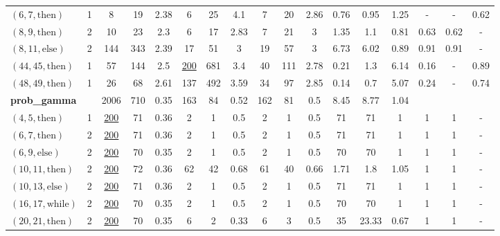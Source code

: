 \documentclass[sigconf]{acmart}
\newcommand{\thenBr}{\text{then}}
\newcommand{\elseBr}{\text{else}}
\newcommand{\inWhile}{\text{while}}
\newcommand{\un}[1]{\underline{#1}}
\begin{document}
\begin{table}[!t]
\begin{tabular}{lc|ccc|ccc|ccc|ccc|ccc}
    $(6,7,\thenBr)$   & 1        & 8        & 19   & 2.38      & 6    & 25   & 4.1          & 7   & 20  & 2.86             & 0.76   & 0.95  & 1.25   & - & -  &  0.62 \\
    $(8,9,\thenBr)$   & 2        & 10       & 23   & 2.3       & 6    & 17   & 2.83         & 7   & 21  & 3                & 1.35   & 1.1   & 0.81   & 0.63 & 0.62 &  - \\
    $(8,11,\elseBr)$  & 2        & 144      & 343  & 2.39      & 17   & 51   & 3            & 19  & 57  & 3                & 6.73   & 6.02  & 0.89   & 0.91 & 0.91 &  - \\
    $(44,45,\thenBr)$ & 1        & 57       & 144  & 2.5       & \un{200} & 681  & 3.4      & 40  & 111 & 2.78             & 0.21   & 1.3   & 6.14   & 0.16 & - &  0.89 \\
    $(48,49,\thenBr)$ & 1        & 26       & 68   & 2.61      & 137  & 492  & 3.59         & 34  & 97  & 2.85             & 0.14   & 0.7   & 5.07   & 0.24 & - &  0.74 \\
    \toprule
\multicolumn{2}{l|}{\textbf{prob\_gamma}}        
                                 & 2006     & 710  & 0.35      & 163 & 84   & 0.52          & 162 & 81  & 0.5              & 8.45   & 8.77  & 1.04   &  &   &        \\
    $(4,5,\thenBr)$   & 1        & \un{200} & 71   & 0.36      & 2   & 1    & 0.5           & 2   & 1   & 0.5              & 71     & 71    & 1      & 1 & 1 &  -  \\
    $(6,7,\thenBr)$   & 2        & \un{200} & 71   & 0.36      & 2   & 1    & 0.5           & 2   & 1   & 0.5              & 71     & 71    & 1      & 1 & 1 &  -  \\
    $(6,9,\elseBr)$   & 2        & \un{200} & 70   & 0.35      & 2   & 1    & 0.5           & 2   & 1   & 0.5              & 70     & 70    & 1      & 1 & 1 &  -  \\
    $(10,11,\thenBr)$ & 2        & \un{200} & 72   & 0.36      & 62  & 42   & 0.68          & 61  & 40  & 0.66             & 1.71   & 1.8   & 1.05   & 1 & 1 &  -  \\
    $(10,13,\elseBr)$ & 2        & \un{200} & 71   & 0.36      & 2   & 1    & 0.5           & 2   & 1   & 0.5              & 71     & 71    & 1      & 1 & 1 &  -  \\
    $(16,17,\inWhile)$& 2        & \un{200} & 70   & 0.35      & 2   & 1    & 0.5           & 2   & 1   & 0.5              & 70     & 70    & 1      & 1 & 1 &  -  \\
    $(20,21,\thenBr)$ & 2        & \un{200} & 70   & 0.35      & 6   & 2    & 0.33          & 6   & 3   & 0.5              & 35     & 23.33 & 0.67   & 1 & 1 &  -  \\

\end{tabular}
\end{table}
\end{document}
